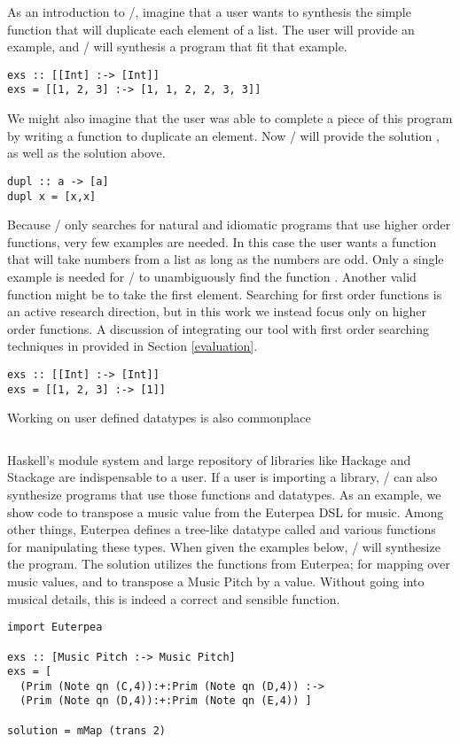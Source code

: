 As an introduction to \ourTool/, imagine that a user wants to synthesis the simple  function that will duplicate each element of a list.
The user will provide an example, and \ourTool/ will synthesis a program  that fit that example.

\begin{lstlisting}
exs :: [[Int] :-> [Int]]
exs = [[1, 2, 3] :-> [1, 1, 2, 2, 3, 3]]
\end{lstlisting}

We might also imagine that the user was able to complete a piece of this program by writing a function  to duplicate an element. Now \ourTool/ will provide the solution , as well as the solution above.

\begin{lstlisting}
dupl :: a -> [a]
dupl x = [x,x]
\end{lstlisting}

Because \ourTool/ only searches for natural and idiomatic programs that use higher order functions, very few examples are needed. In this case the user wants a function that will take numbers from a list as long as the numbers are odd. Only a single example is needed for \ourTool/ to unambiguously find the function . Another valid function might be  to take the first element. Searching for first order functions is an active research direction, but in this work we instead focus only on higher order functions. A discussion of integrating our tool with first order searching techniques in provided in Section \ref{evaluation}.

\begin{lstlisting}
exs :: [[Int] :-> [Int]]
exs = [[1, 2, 3] :-> [1]]
\end{lstlisting}

Working on user defined datatypes is also commonplace

\begin{lstlisting}

\end{lstlisting}

Haskell's module system and large repository of libraries like Hackage and Stackage are indispensable to a user\cite{hackage,stackage}. If a user is importing a library, \ourTool/ can also synthesize programs that use those functions and datatypes. As an example, we show code to transpose a music value from the Euterpea DSL for music\cite{Euterpea}. Among other things, Euterpea defines a tree-like datatype called  and various functions for manipulating these types. When given the examples below, \ourTool/ will synthesize the  program. The solution utilizes the functions from Euterpea;  for mapping over music values, and  to transpose a Music Pitch by a value. Without going into musical details, this is indeed a correct and sensible function. 

\begin{lstlisting}
import Euterpea

exs :: [Music Pitch :-> Music Pitch]
exs = [
  (Prim (Note qn (C,4)):+:Prim (Note qn (D,4)) :->
  (Prim (Note qn (D,4)):+:Prim (Note qn (E,4)) ]
        
solution = mMap (trans 2)
\end{lstlisting}
